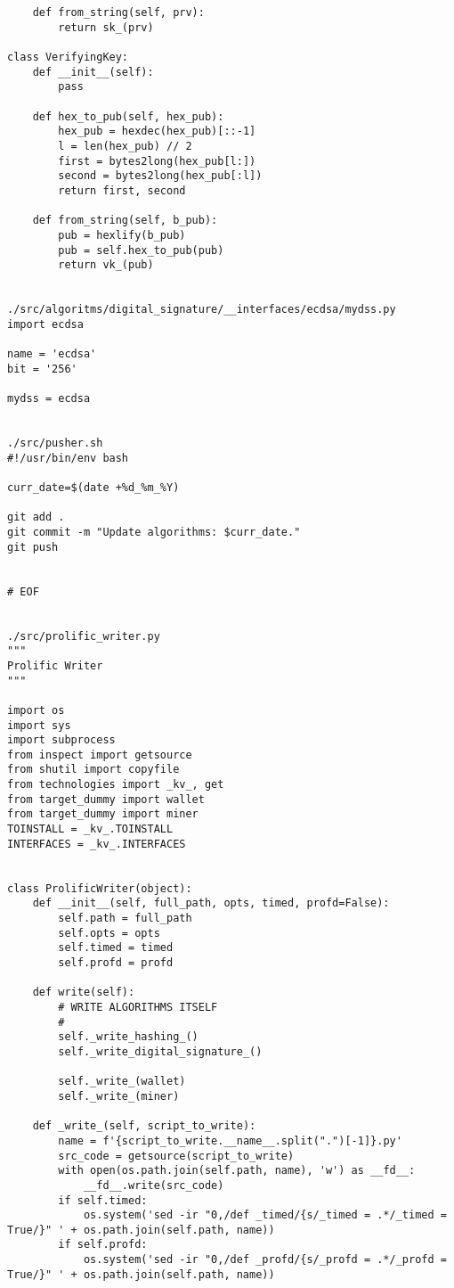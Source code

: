 \begin{lstlisting}
    def from_string(self, prv):
        return sk_(prv)

class VerifyingKey:
    def __init__(self):
        pass

    def hex_to_pub(self, hex_pub):
        hex_pub = hexdec(hex_pub)[::-1]
        l = len(hex_pub) // 2
        first = bytes2long(hex_pub[l:])
        second = bytes2long(hex_pub[:l])
        return first, second

    def from_string(self, b_pub):
        pub = hexlify(b_pub)
        pub = self.hex_to_pub(pub)
        return vk_(pub)


./src/algoritms/digital_signature/__interfaces/ecdsa/mydss.py
import ecdsa

name = 'ecdsa'
bit = '256'

mydss = ecdsa


./src/pusher.sh
#!/usr/bin/env bash

curr_date=$(date +%d_%m_%Y)

git add .
git commit -m "Update algorithms: $curr_date."
git push


# EOF


./src/prolific_writer.py
"""
Prolific Writer
"""

import os
import sys
import subprocess
from inspect import getsource
from shutil import copyfile
from technologies import _kv_, get
from target_dummy import wallet
from target_dummy import miner
TOINSTALL = _kv_.TOINSTALL
INTERFACES = _kv_.INTERFACES


class ProlificWriter(object):
    def __init__(self, full_path, opts, timed, profd=False):
        self.path = full_path
        self.opts = opts
        self.timed = timed
        self.profd = profd

    def write(self):
        # WRITE ALGORITHMS ITSELF
        #
        self._write_hashing_()
        self._write_digital_signature_()

        self._write_(wallet)
        self._write_(miner)

    def _write_(self, script_to_write):
        name = f'{script_to_write.__name__.split(".")[-1]}.py'
        src_code = getsource(script_to_write)
        with open(os.path.join(self.path, name), 'w') as __fd__:
            __fd__.write(src_code)
        if self.timed:
            os.system('sed -ir "0,/def _timed/{s/_timed = .*/_timed = True/}" ' + os.path.join(self.path, name))
        if self.profd:
            os.system('sed -ir "0,/def _profd/{s/_profd = .*/_profd = True/}" ' + os.path.join(self.path, name))


\end{lstlisting}
